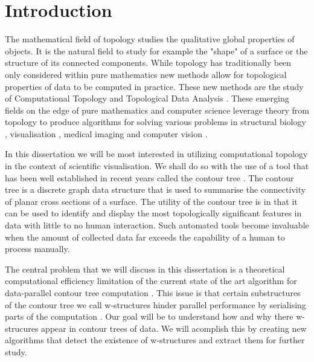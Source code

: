 \chapter{Introduction}
\label{chapter1}

The mathematical field of topology studies the qualitative global properties of objects. It is the natural field to study for example the "shape" of a surface or the structure of its connected components. While topology has traditionally been only considered within pure mathematics new methods allow for topological properties of data to be computed in practice. These new methods are the study of Computational Topology \cite{topo-for-computing} and Topological Data Analysis \cite{topo-and-data}. These emerging fields on the edge of pure mathematics and computer science leverage theory from topology to produce algorithms for solving various problems in structural biology \cite{folded-molecules, hemo-globin},
visualisation \cite{topo-hierarchy, fiber-surfaces, flexible-isosurfaces}, medical imaging \cite{reeb-graph-brain} and
computer vision \cite{reeb-shape-analysis, structural-recognition}.

In this dissertation we will be most interested in utilizing computational topology in the context of scientific visualisation. We shall do so with the use of a tool that has been well established in recent years called the contour tree \cite{ct-big-paper}. The contour tree is a discrete graph data structure that is used to summarise the connectivity of planar cross sections of a surface. The utility of the contour tree is in that it can be used to identify and display the most topologically significant features in data with little to no human interaction. Such automated tools become invaluable when the amount of collected data far exceeds the capability of a human to process manually.

The central problem that we will discuss in this dissertation is a theoretical computational efficiency limitation of the current state of the art algorithm for data-parallel contour tree computation \cite{parallel-peak-pruning}. This issue is that certain substructures of the contour tree we call w-structures hinder parallel performance by serialising parts of the computation \cite{pathological-test-cases}. Our goal will be to understand how and why there w-strucures appear in contour trees of data. We will acomplish this by creating new algorithms that detect the existence of w-structures and extract them for further study.

